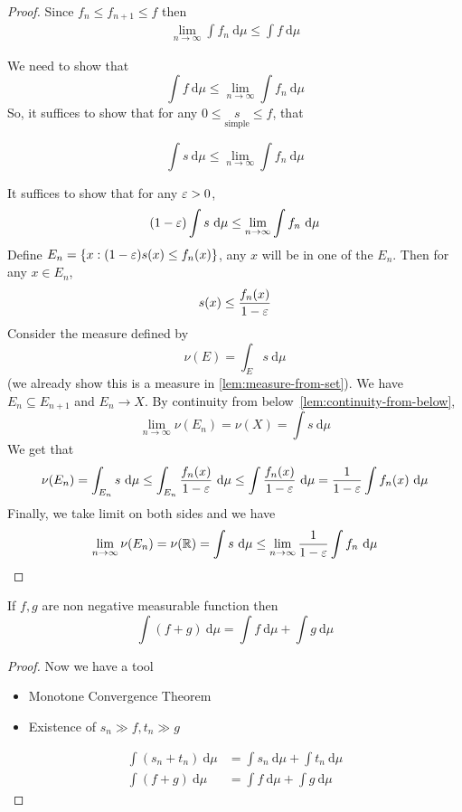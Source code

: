 \begin{proof}

  Since $f_n \le f_{n+1} \le f$ then 
  \begin{align*}
    \lim_{n\to\infty}\int f_n\ \mathrm{d}\mu \le \int f\ \mathrm{d}\mu
  \end{align*}

  We need to show that $$\int f \ \mathrm{d}\mu\le \lim\limits_{n\to\infty} \int f_n\ \mathrm{d}\mu$$
  So, it suffices to show that for any $0 \le \underset{\text{simple}}s \le f$, that 

  $$\int s\ \mathrm{d}\mu \le \lim\limits_{n\to\infty} \int f_n\ \mathrm{d}\mu$$

  It suffices to show that for any $\varepsilon > 0$, 
  $$(1-\varepsilon)\int s\ \mathrm{d}\mu \le \lim_{n\to\infty} \int f_n\ \mathrm{d}\mu$$
  Define $E_n = \{x : (1 - \varepsilon)s(x) \le f_n(x)\}$, any $x$ will be in one of the $E_n$.
  Then for any $x \in E_n$, 
  $$s(x) \le \frac{f_n(x)}{1-\varepsilon}$$
  Consider the measure defined by $$\nu(E) = \int_E s\ \mathrm{d}\mu$$ (we already show this is a measure in \ref{lem:measure-from-set}).
  We have $E_n \subseteq E_{n+1}$ and $E_n \to X$. By continuity from below~\ref{lem:continuity-from-below}, 
  $$\lim\limits_{n\to\infty}\nu(E_n) = \nu(X) = \int s\ \mathrm{d}\mu$$
  We get that
  $$\nu(E_n) = \int_{E_n} s\ \mathrm{d}\mu \le \int_{E_n} \frac{f_n(x)}{1-\eps}\ \mathrm{d}\mu \leq \int\frac{f_n(x)}{1-\eps}\ \mathrm{d}\mu = \frac1{1-\eps}\int f_n(x)\ \mathrm{d}\mu$$
  Finally, we take limit on both sides and we have 
  $$\lim_{n\to\infty}\nu(E_n) = \nu(\RR) = \int s\ \mathrm{d}\mu \le \lim_{n\to\infty} \frac1{1-\eps} \int f_n\ \mathrm{d}\mu$$
\end{proof}

\begin{lemma}
  If $f, g$ are non negative measurable function then 
  \[\int (f+g)\ \mathrm{d}\mu = \int f\ \mathrm{d}\mu + \int g\ \mathrm{d}\mu\]
\end{lemma}

\begin{proof}
  Now we have a tool \begin{itemize}
    \item Monotone Convergence Theorem
    \item Existence of $s_n\gg f, t_n \gg g$
  \end{itemize}
  \begin{align*}
    \int (s_n + t_n)\ \mathrm{d}\mu &= \int s_n\ \mathrm{d}\mu + \int t_n\ \mathrm{d}\mu \\
    \int (f + g)\ \mathrm{d}\mu &= \int f\ \mathrm{d}\mu + \int g\ \mathrm{d}\mu
  \end{align*}
\end{proof}

